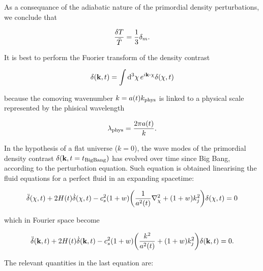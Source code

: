 As a consequance of the adiabatic nature of the primordial density
perturbations, we conclude that

\begin{equation}
        \frac{\var{T}}{\bar T} = \frac{1}{3} \delta_m.
\end{equation}

It is best to perform the Fuorier transform of the density contrast

\begin{equation}
        \delta \qty(\vb{k},t) = \int \dd[3]{\vb{\chi}} e^{i\vb{k} \vdot
        \vb{\chi}} \delta\qty(\vb{\chi},t)
\end{equation}

because the comoving wavenumber $k = a\qty(t) k_\text{phys}$ is linked to a
physical scale represented by the phisical wavelength

\begin{equation}
        \lambda_\text{phys} = \frac{2\pi a\qty(t)}{k}.
\end{equation}

In the hypothesis  of a flat universe ($k = 0$), the wave modes of the
primordial density contrast $\delta\qty(\vb{k},t = t_\text{BigBang})$
has evolved over time since Big Bang, according to the perturbation
equation. Such equation is obtained linearising the fluid equations
for a perfect fluid in an expanding spacetime:

\begin{equation}
        \ddot \delta\qty(\vb{\chi},t) + 2H\qty(t)\dot \delta\qty(\vb{\chi},t) -
        c_s^2\qty(1 + w)\qty(\frac{1}{a^2\qty(t)} \laplacian_\chi + \qty(
        1 + w)k^2_j)
        \delta\qty(\vb{\chi},t) = 0
\end{equation}

which in Fourier space become

\begin{equation}
        \ddot \delta\qty(\vb{k},t) + 2H\qty(t)\dot \delta\qty(\vb{k},t) -
        c_s^2\qty(1 + w)\qty(\frac{k^2}{a^2\qty(t)} + \qty(1 + w)k^2_j)
        \delta\qty(\vb{k},t) = 0.
        \label{eq:perturbations_density}
\end{equation}

The relevant quantities in the last equation are:

